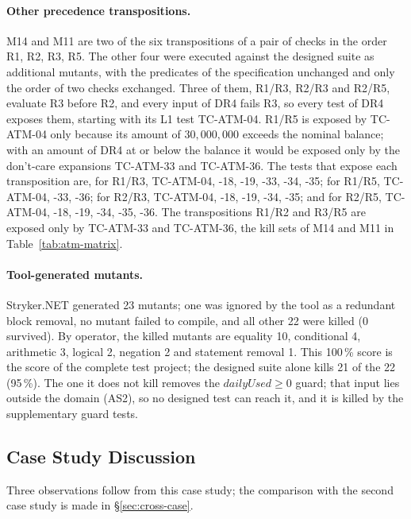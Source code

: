 \documentclass[11pt,a4paper]{article}
\begin{document}
\paragraph{Other precedence transpositions.} M14 and M11 are two of the six
transpositions of a pair of checks in the order R1, R2, R3, R5. The other
four were executed against the designed suite as additional mutants, with
the predicates of the specification unchanged and only the order of two
checks exchanged. Three of them, R1/R3, R2/R3 and R2/R5, evaluate R3
before R2, and every input of DR4 fails R3, so every test of DR4 exposes
them, starting with its L1 test TC-ATM-04. R1/R5 is exposed by TC-ATM-04
only because its amount of \(30{,}000{,}000\) exceeds the nominal balance;
with an amount of DR4 at or below the balance it would be exposed only by
the don't-care expansions TC-ATM-33 and TC-ATM-36. The tests that expose
each transposition are, for
R1/R3, TC-ATM-04, -18, -19, -33, -34, -35; for R1/R5, TC-ATM-04, -33, -36;
for R2/R3, TC-ATM-04, -18, -19, -34, -35; and for R2/R5, TC-ATM-04, -18,
-19, -34, -35, -36. The transpositions R1/R2 and R3/R5 are exposed only by
TC-ATM-33 and TC-ATM-36, the kill sets of M14 and M11 in
Table~\ref{tab:atm-matrix}.

\paragraph{Tool-generated mutants.} Stryker.NET generated 23 mutants; one
was ignored by the tool as a redundant block removal, no mutant failed to
compile, and all other 22 were killed (0 survived). By operator, the killed
mutants are equality 10, conditional 4, arithmetic 3, logical 2, negation 2
and statement removal 1. This 100\,\% score is the score of the complete
test project; the designed suite alone kills 21 of the 22 (95\,\%). The one
it does not kill removes the \(\mathit{dailyUsed}\ge0\) guard; that input
lies outside the domain (AS2), so no designed test can reach it, and it is
killed by the supplementary guard tests.
\subsection{Case Study Discussion}
\label{sec:atm-discussion}

Three observations follow from this case study; the comparison with the
second case study is made in \S\ref{sec:cross-case}.
\end{document}
